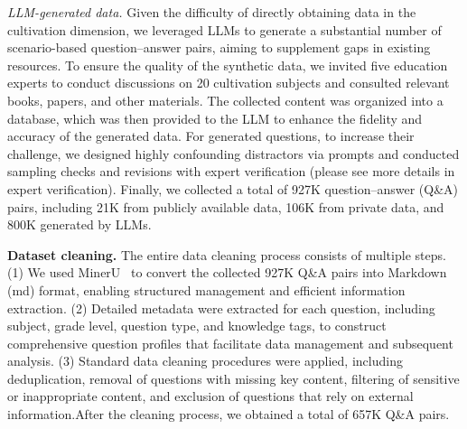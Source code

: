 \textit{LLM-generated data.}
Given the difficulty of directly obtaining data in the cultivation dimension, we leveraged LLMs to generate a substantial number of scenario-based question–answer pairs, aiming to supplement gaps in existing resources. To ensure the quality of the synthetic data, we invited five education experts to conduct discussions on 20 cultivation subjects and consulted relevant books, papers, and other materials. The collected content was organized into a database, which was then provided to the LLM to enhance the fidelity and accuracy of the generated data. For generated questions, to increase their challenge, we designed highly confounding distractors via prompts and conducted sampling checks and revisions with expert verification (please see more details in expert verification). 
\textcolor{myorange}{Finally, we collected a total of 927K question–answer (Q\&A) pairs, including 21K from publicly available data, 106K from private data, and 800K generated by LLMs.}

\textbf{Dataset cleaning.}
The entire data cleaning process consists of multiple steps. (1) We used MinerU~\citep{wang2024mineru} to convert the collected 927K Q\&A pairs into Markdown (md) format, enabling structured management and efficient information extraction. (2) Detailed metadata were extracted for each question, including subject, grade level, question type, and knowledge tags, to construct comprehensive question profiles that facilitate data management and subsequent analysis. (3) Standard data cleaning procedures were applied, including deduplication, removal of questions with missing key content, filtering of sensitive or inappropriate content, and exclusion of questions that rely on external information.\textcolor{myorange}{After the cleaning process, we obtained a total of 657K Q\&A pairs.}

